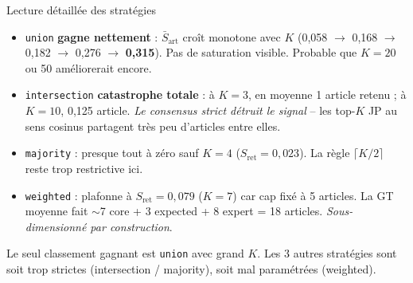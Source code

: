 \documentclass[aspectratio=169,10pt]{beamer}
\newcommand{\keybox}[1]{%
  \begin{center}
  \colorbox{accentsoft}{\parbox{0.92\linewidth}{\centering #1}}
  \end{center}}
\begin{document}
\begin{frame}{Lecture détaillée des stratégies}
  \footnotesize
  \begin{itemize}
    \item \texttt{union} \textbf{gagne nettement} : $\bar{S}_{\text{art}}$ croît monotone avec $K$ (0,058 $\to$ 0,168 $\to$ 0,182 $\to$ 0,276 $\to$ \textbf{0,315}). Pas de saturation visible. Probable que $K=20$ ou 50 améliorerait encore.

    \vspace{0.4em}
    \item \texttt{intersection} \textbf{catastrophe totale} : à $K=3$, en moyenne 1 article retenu ; à $K=10$, 0,125 article. \textit{Le consensus strict détruit le signal} -- les top-$K$ JP au sens cosinus partagent très peu d'articles entre elles.

    \vspace{0.4em}
    \item \texttt{majority} : presque tout à zéro sauf $K=4$ ($S_{\text{ret}} = 0{,}023$). La règle $\lceil K/2 \rceil$ reste trop restrictive ici.

    \vspace{0.4em}
    \item \texttt{weighted} : plafonne à $S_{\text{ret}} = 0{,}079$ ($K=7$) car cap fixé à 5 articles. La GT moyenne fait $\sim$7 core + 3 expected + 8 expert = 18 articles. \textit{Sous-dimensionné par construction}.
  \end{itemize}

  \vspace{0.6em}
  \keybox{Le seul classement gagnant est \texttt{union} avec grand $K$. Les 3 autres stratégies sont soit trop strictes (intersection / majority), soit mal paramétrées (weighted).}
\end{frame}
\end{document}
